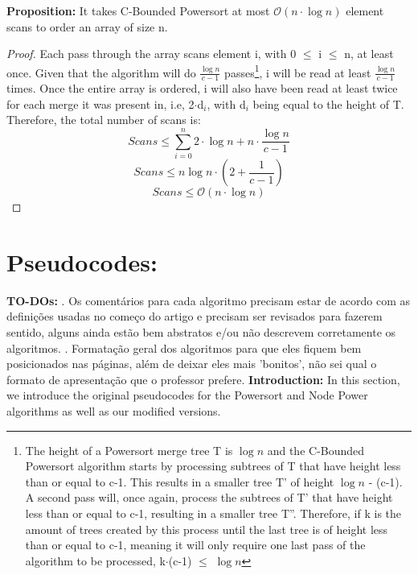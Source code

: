 \documentclass{article}
\newcommand{\bigO}{\mathcal{O}}
\begin{document}
\textbf{Proposition:} It takes C-Bounded Powersort at most $\bigO(n \cdot \log{n})$ element scans to order an array of size n. 
\begin{proof}
Each pass through the array scans element i, with 0 $\leq$ i $\leq$ n, at least once. Given that the algorithm will 
do $\frac{\log{n}}{c-1}$ passes\footnote{The height of a Powersort merge tree T is $\log n$ and the C-Bounded Powersort
algorithm starts by processing subtrees of T that have height less than or equal to c-1. 
This results in a smaller tree T' of height $\log n$ - (c-1). A second pass will, once again, 
process the subtrees of T' that have height less than or equal to c-1, resulting in a smaller tree T''. 
Therefore, if k is the amount of trees created by this process until the last tree is of height less than or equal to c-1, 
meaning it will only require one last pass of the algorithm to be processed, k$\cdot$(c-1) $\leq$ $\log n$}, i will be read
at least $\frac{\log{n}}{c-1}$ times. Once the entire array is ordered, i will also have been read at least twice 
for each merge it was present in, i.e, 2$\cdot$d$_i$, with d$_i$ being equal to the height of T. Therefore,
the total number of scans is:
\begin{equation}
Scans \leq \sum^{n}_{i=0}2\cdot \log{n} + n \cdot \frac{\log{n}}{c-1}
\end{equation}
\begin{equation}
Scans \leq n\log{n}\cdot(2 + \frac{1}{c-1})
\end{equation}
\begin{equation}
Scans \leq \bigO(n \cdot \log{n})
\end{equation}
\end{proof} 
\newpage

\section{Pseudocodes:}
\noindent\textbf{TO-DOs:} \newline
{}. Os comentários para cada algoritmo precisam estar de acordo com as definições usadas
no começo do artigo e precisam ser revisados para fazerem
sentido, alguns ainda estão bem abstratos e/ou não descrevem corretamente os algoritmos. \newline
{}. Formatação geral dos algoritmos para que eles fiquem bem posicionados nas páginas, além de
deixar eles mais 'bonitos', não sei qual o formato de apresentação que o professor prefere. \newline 
\noindent \textbf{Introduction:} In this section, we introduce the original pseudocodes for the Powersort and Node Power algorithms
as well as our modified versions.
\end{document}
